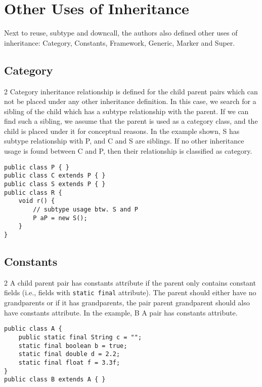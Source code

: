 \documentclass{uvamscse}
\begin{document}
\section{Other Uses of Inheritance}
Next to reuse, subtype and downcall, the authors also defined other uses of inheritance: Category, Constants, Framework, Generic, Marker and Super.

\subsection{Category}
\begin{multicols} {2}
Category inheritance relationship is defined for the child parent pairs which can not be placed under any other inheritance definition. In this case, we search for a sibling of the child which has a subtype relationship with the parent. If we can find such a sibling, we assume that the parent is used as a category class, and the child is placed under it for conceptual reasons. In the example shown, S has subtype relationship with P, and C and S are siblings. If no other inheritance usage is found between C and P, then their relationship is classified as category. 
\columnbreak
\begin{verbatim}
public class P { }
public class C extends P { }
public class S extends P { }
public class R {
    void r() {
    	// subtype usage btw. S and P
        P aP = new S();  
    }          
}
\end{verbatim}
\end{multicols}
       
\subsection{Constants}
\begin{multicols} {2}
A child parent pair has constants attribute if the parent only contains constant fields (i.e., fields with \texttt{static final} attribute). The parent should either have no grandparents or if it has grandparents, the pair parent grandparent should also have constants attribute. In the example, B A pair has constants attribute.
\columnbreak
\begin{verbatim}
public class A {
    public static final String c = ""; 
    static final boolean b = true;		
    static final double d = 2.2;		
    static final float f = 3.3f;		
}
public class B extends A { }
\end{verbatim}
\end{multicols}
\end{document}
